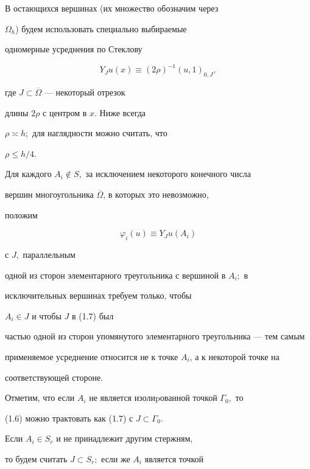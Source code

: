  В остающихся вершинах (их множество обозначим через


$\Omega_h$) будем использовать специально выбираемые


одномерные усред\-нения по Стеклову


\begin{equation}


Y_J u(x)\equiv (2\rho )^{-1}(u,1)_{0,J},


\end{equation}


где $J\subset \overline\Omega$ --- некоторый отрезок


 длины $2\rho$ с центром в $x.$ Ниже всегда


$\rho\asymp h;$ для наглядности можно считать, что


$\rho\le h/4$.





Для каждого $A_i\notin S,$ за исключением некоторого конечного числа


вершин многоугольника $\overline\Omega$, в которых это невозможно,


положим


\begin{equation}


\varphi_i(u)\equiv Y_J u(A_i)


\end{equation}


с $J,$ параллельным


одной из сторон элементарного треугольника с вершиной в $A_i;$ в


исключительных вершинах требуем только, чтобы


$A_i \in J$ и чтобы $J$ в (1.7) был


частью одной из сторон упомянутого элементарного треугольника --- тем самым


при\-меняемое усреднение относится не к точке $A_i$, а к некоторой точке на


соответствующей стороне.


Отметим, что если $A_i$ не является изолиpованной точкой $\Gamma_0,$ то


(1.6) можно трактовать как (1.7) с $J\subset \Gamma_0.$





Если $A_i\in S_r$ и не принадлежит другим стержням,


то будем считать $J\subset S_r;$ если же $A_i$ является точкой


